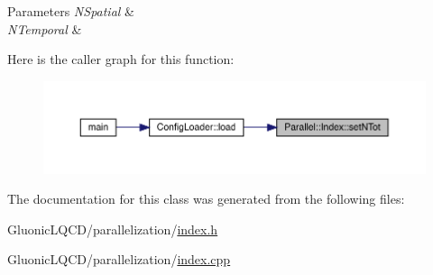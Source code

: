 \begin{DoxyParams}{Parameters}
{\em N\+Spatial} & \\
\hline
{\em N\+Temporal} & \\
\hline
\end{DoxyParams}
Here is the caller graph for this function\+:
\nopagebreak
\begin{figure}[H]
\begin{center}
\leavevmode
\includegraphics[width=350pt]{class_parallel_1_1_index_a125dc4d990ded636c91b959474c27d1f_icgraph}
\end{center}
\end{figure}


The documentation for this class was generated from the following files\+:\begin{DoxyCompactItemize}
\item 
Gluonic\+L\+Q\+C\+D/parallelization/\mbox{\hyperlink{index_8h}{index.\+h}}\item 
Gluonic\+L\+Q\+C\+D/parallelization/\mbox{\hyperlink{index_8cpp}{index.\+cpp}}\end{DoxyCompactItemize}
